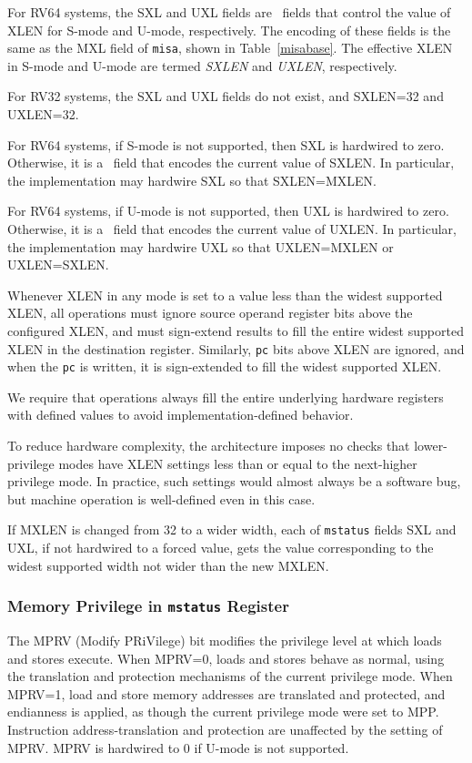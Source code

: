 For RV64 systems, the SXL and UXL fields are \warl\ fields
that control the value of XLEN for S-mode and U-mode,
respectively. The encoding of these fields is the same as the MXL
field of {\tt misa}, shown in Table~\ref{misabase}.  The effective
XLEN in S-mode and U-mode are termed {\em SXLEN} and {\em UXLEN},
respectively.

For RV32 systems, the SXL and UXL fields do not exist, and
SXLEN=32 and UXLEN=32.

For RV64 systems, if S-mode is not supported, then SXL is hardwired
to zero.  Otherwise, it is a \warl\ field that encodes the current value of
SXLEN.  In particular, the implementation may hardwire SXL so that
SXLEN=MXLEN.

For RV64 systems, if U-mode is not supported, then UXL is hardwired
to zero.  Otherwise, it is a \warl\ field that encodes the current value of
UXLEN.  In particular, the implementation may hardwire UXL so that
UXLEN=MXLEN or UXLEN=SXLEN.

Whenever XLEN in any mode is set to a value less than the widest
supported XLEN, all operations must ignore source operand register
bits above the configured XLEN, and must sign-extend results to fill
the entire widest supported XLEN in the destination register.
Similarly, {\tt pc} bits above XLEN are ignored, and when the {\tt pc}
is written, it is sign-extended to fill the widest supported XLEN.
\begin{commentary}
We require that operations always fill the entire underlying hardware
registers with defined values to avoid implementation-defined
behavior.

To reduce hardware complexity, the architecture imposes no checks that
lower-privilege modes have XLEN settings less than or equal to the
next-higher privilege mode.  In practice, such settings would almost
always be a software bug, but machine operation is well-defined even in this
case.
\end{commentary}

If MXLEN is changed from 32 to a wider width, each of {\tt mstatus} fields SXL and
UXL, if not hardwired to a forced value, gets the value corresponding to the
widest supported width not wider than the new MXLEN.

\subsubsection{Memory Privilege in {\tt mstatus} Register}

The MPRV (Modify PRiVilege) bit modifies the privilege level at which loads
and stores execute.  When MPRV=0, loads and stores
behave as normal, using the translation and protection mechanisms of the
current privilege mode.
When MPRV=1, load and store memory addresses are translated and protected, and
endianness is applied, as though the current privilege mode were set to MPP.
Instruction address-translation and protection are unaffected by the setting
of MPRV.  MPRV is hardwired to 0 if U-mode is not supported.

